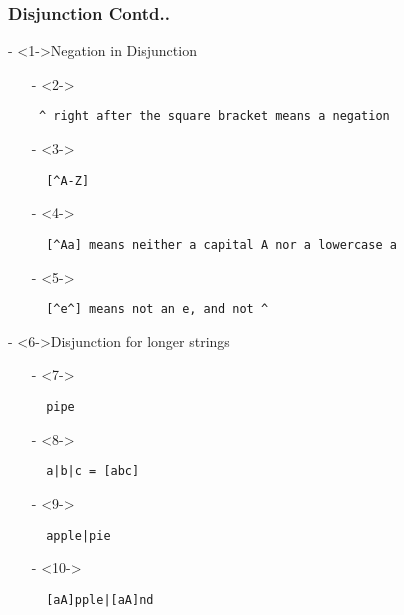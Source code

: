 \documentclass[compress, black]{beamer}
\begin{document}
\begin{frame}[fragile]
	\frametitle{Disjunction Contd..}
	\begin{large_enum}
	\item[-]<1->Negation in Disjunction\\\normalsize
			\begin{enumerate}
			\item[-]<2-> \begin{verbatim} ^ right after the square bracket means a negation \end{verbatim}
			\item[-]<3-> \begin{verbatim}  [^A-Z] \end{verbatim}
			\item[-]<4-> \begin{verbatim}  [^Aa] means neither a capital A nor a lowercase a \end{verbatim}
			\item[-]<5-> \begin{verbatim}  [^e^] means not an e, and not ^ \end{verbatim}
			\end{enumerate}
	\item[-]<6->Disjunction for longer strings\\\normalsize
			\begin{enumerate}
			    \item[-]<7-> \begin{verbatim}  pipe \end{verbatim}
				\item[-]<8-> \begin{verbatim}  a|b|c = [abc] \end{verbatim}
				\item[-]<9-> \begin{verbatim}  apple|pie \end{verbatim}
				\item[-]<10-> \begin{verbatim}  [aA]pple|[aA]nd \end{verbatim}
			\end{enumerate}
	\end{large_enum}
\end{frame}
\end{document}

